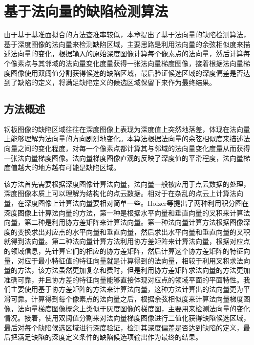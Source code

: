 ﻿%
%
%
%
%
%

\chapter{基于法向量的缺陷检测算法}
由于基于基准面拟合的方法查准率较低，本章提出了基于法向量的缺陷检测算法，基于深度图像的法向量来检测缺陷区域，主要思路是利用法向量的余弦相似度来描述法向量的变化，根据输入的原始深度图像计算每个像素点的法向量，然后计算每个像素点与其邻域的法向量变化度量获得一张法向量梯度图像，接着根据法向量梯度图像使用双阈值分割获得候选的缺陷区域，最后验证候选区域的深度偏差是否达到了缺陷的定义，将满足缺陷定义的候选区域保留下来作为最终结果。
    \section{方法概述}
    钢板图像的缺陷区域往往在深度图像上表现为深度值上突然地落差，体现在法向量上能够理解为法向量的方向剧烈地变化。本算法根据法向量的余弦相似度来描述法向量之间的变化程度，对每一个像素点都计算其与邻域的法向量变化度量从而获得一张法向量梯度图像。法向量梯度图像直观的反映了深度值的平滑程度，法向量梯度值越大的地方越有可能是缺陷区域。

    该方法首先需要根据深度图像计算法向量，法向量一般被应用于点云数据的处理，深度图像本质上可以理解为结构化的点云数据。相对于在杂乱的点云上计算法向量，在深度图像上计算法向量要相对简单一些。Holzer等\cite{Holzer2012Adaptive}提出了两种利用积分图在深度图像上计算法向量的方法，第一种是根据水平向量和垂直向量的叉积来计算法向量，第二种是利用协方差矩阵来计算法向量。第一种法向量计算方法根据图像深度的变换求出对应点的水平向量和垂直向量，然后求出水平向量和垂直向量的叉积就得到法向量。第二种法向量计算方法利用协方差矩阵来计算法向量，根据对应点的领域信息，先计算它们的相应的协方差矩阵，然后计算这个协方差矩阵的特征向量，对应于最小特征值的特征向量就是计算得到的法向量，相较于利用叉积求法向量的方法，该方法虽然更加复杂和费时，但是利用协方差矩阵求法向量的方法更加准确可靠，并且协方差的特征向量能够直接体现对应点的领域平面的平面特性。我们主要使用基于协方差矩阵的方法来计算法向量，这种方法计算出的法向量更为平滑可靠。计算得到每个像素点的法向量之后，根据余弦相似度来计算法向量梯度图像，法向量梯度图像概念上类似于灰度图像的梯度图，主要用来检测法向量的变化情况。接着，使用双阈值分割来对法向量梯度图像进行二值化获得缺陷候选区域，最后对每个缺陷候选区域进行深度验证，检测其深度偏差是否达到缺陷的定义，最后把满足缺陷的深度定义条件的缺陷候选项输出作为最终的结果。

